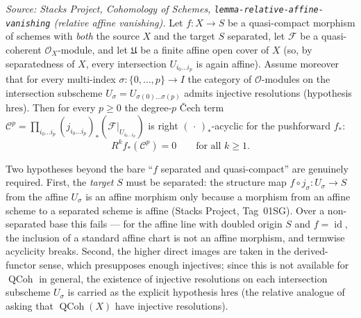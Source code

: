 \begin{lemma}
  \label{mk-lem:cech_term_pushforward_acyclic}

  \textit{Source: Stacks Project, Cohomology of Schemes,
  \texttt{lemma-relative-affine-vanishing} (relative affine vanishing).}
  Let \(f : X \to S\) be a quasi-compact morphism of schemes with \emph{both} the
  source \(X\) and the target \(S\) separated, let \(\mathcal{F}\) be a
  quasi-coherent \(\mathcal{O}_X\)-module, and let \(\mathfrak{U}\) be a finite
  affine open cover of \(X\) (so, by separatedness of \(X\), every intersection
  \(U_{i_0 \ldots i_p}\) is again affine). Assume moreover that for every
  multi-index \(\sigma : \{0, \ldots, p\} \to I\) the category of
  \(\mathcal{O}\)-modules on the intersection subscheme
  \(U_\sigma = U_{\sigma(0) \ldots \sigma(p)}\) admits injective resolutions
  (hypothesis \(\mathrm{hres}\)). Then for every \(p \geq 0\) the degree-\(p\)
  {\v C}ech term \(\mathcal{C}^p =
  \prod_{i_0 \ldots i_p} (j_{i_0 \ldots i_p})_*(\mathcal{F}|_{U_{i_0 \ldots i_p}})\)
  is right \((\,\cdot\,)_*\)-acyclic for the pushforward \(f_*\):
  \[
    R^k f_*(\mathcal{C}^p) = 0
      \qquad \text{for all } k \geq 1.
  \]

  Two hypotheses beyond the bare ``\(f\) separated and quasi-compact'' are genuinely
  required. First, the \emph{target} \(S\) must be separated: the structure map
  \(f \circ j_\sigma : U_\sigma \to S\) from the affine \(U_\sigma\) is an affine
  morphism only because a morphism from an affine scheme to a separated scheme is
  affine (Stacks Project, Tag~01SG). Over a non-separated base this fails --- for the
  affine line with doubled origin \(S\) and \(f = \operatorname{id}\), the inclusion
  of a standard affine chart is not an affine morphism, and termwise acyclicity
  breaks. Second, the higher direct images are taken in the derived-functor sense,
  which presupposes enough injectives; since this is not available for
  \(\operatorname{QCoh}\) in general, the existence of injective resolutions on each
  intersection subscheme \(U_\sigma\) is carried as the explicit hypothesis
  \(\mathrm{hres}\) (the relative analogue of asking that
  \(\operatorname{QCoh}(X)\) have injective resolutions).
\end{lemma}
